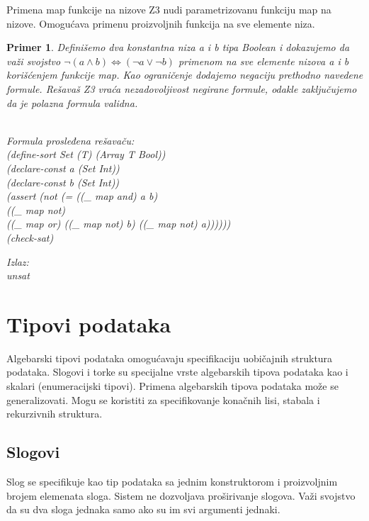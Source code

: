\documentclass[12pt,oneside]{memoir}
\newtheorem{primer}{Primer}
\begin{document}
Primena map funkcije na nizove
Z3 nudi parametrizovanu funkciju map na nizove. Omogućava primenu proizvoljnih funkcija na sve elemente niza.
\begin{primer} Definišemo dva konstantna niza a i b tipa Boolean i dokazujemo da važi svojstvo $\neg{(a \land b)} \Leftrightarrow (\neg{a} \lor \neg{b}) $ primenom na sve elemente nizova a i b korišćenjem funkcije map. Kao ograničenje dodajemo negaciju prethodno navedene formule. Rešavaš Z3 vraća nezadovoljivost negirane formule, odakle zaključujemo da je polazna formula validna.\\ \\
\begin{minipage}[b]{0.5\textwidth}
Formula prosleđena rešavaču:
\\(define-sort Set (T) (Array T Bool))
\\(declare-const a (Set Int))
\\(declare-const b (Set Int))
\\(assert (not (= ((\_ map and) a b) 
\\((\_ map not) 
\\((\_ map or) ((\_ map not) b) ((\_ map not) a))))))
\\(check-sat)
\end{minipage}
\hspace{2.5cm} 
\begin{minipage}[t]{0.5\textwidth}
\vspace{-5.3cm}
Izlaz:
\\unsat 
\end{minipage}
\end{primer}

\section{Tipovi podataka} \label{sec:num3}

Algebarski tipovi podataka omogućavaju specifikaciju uobičajnih struktura podataka. Slogovi i torke su specijalne vrste algebarskih tipova podataka kao i skalari (enumeracijski tipovi). Primena algebarskih tipova podataka može se generalizovati. Mogu se koristiti za specifikovanje konačnih lisi, stabala i rekurzivnih struktura. 
\subsection{Slogovi}
Slog se specifikuje kao tip podataka sa jednim konstruktorom i proizvoljnim brojem elemenata sloga. Sistem ne dozvoljava proširivanje slogova. Važi svojstvo da su dva sloga jednaka samo ako su im svi argumenti jednaki.
\end{document}
